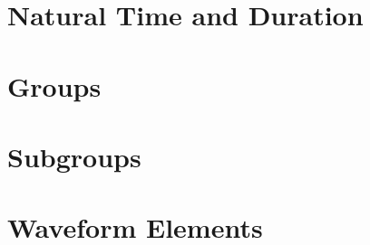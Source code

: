 \section{Natural Time and Duration}
\section{Groups}
\section{Subgroups}
\section{Waveform Elements}
